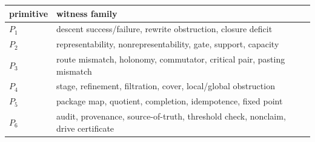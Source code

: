 \documentclass[11pt]{article}
\theoremstyle{definition}
\begin{document}
\begin{longtable}[]{@{}ll@{}}
\toprule
\begin{minipage}[b]{0.08\columnwidth}\raggedright
primitive\strut
\end{minipage} & \begin{minipage}[b]{0.86\columnwidth}\raggedright
witness family\strut
\end{minipage}\tabularnewline
\midrule
\endhead
\begin{minipage}[t]{0.08\columnwidth}\raggedright
\(P_{1}\)\strut
\end{minipage} & \begin{minipage}[t]{0.86\columnwidth}\raggedright
descent success/failure, rewrite obstruction, closure deficit\strut
\end{minipage}\tabularnewline
\begin{minipage}[t]{0.08\columnwidth}\raggedright
\(P_{2}\)\strut
\end{minipage} & \begin{minipage}[t]{0.86\columnwidth}\raggedright
representability, nonrepresentability, gate, support, capacity\strut
\end{minipage}\tabularnewline
\begin{minipage}[t]{0.08\columnwidth}\raggedright
\(P_{3}\)\strut
\end{minipage} & \begin{minipage}[t]{0.86\columnwidth}\raggedright
route mismatch, holonomy, commutator, critical pair, pasting mismatch\strut
\end{minipage}\tabularnewline
\begin{minipage}[t]{0.08\columnwidth}\raggedright
\(P_{4}\)\strut
\end{minipage} & \begin{minipage}[t]{0.86\columnwidth}\raggedright
stage, refinement, filtration, cover, local/global obstruction\strut
\end{minipage}\tabularnewline
\begin{minipage}[t]{0.08\columnwidth}\raggedright
\(P_{5}\)\strut
\end{minipage} & \begin{minipage}[t]{0.86\columnwidth}\raggedright
package map, quotient, completion, idempotence, fixed point\strut
\end{minipage}\tabularnewline
\begin{minipage}[t]{0.08\columnwidth}\raggedright
\(P_{6}\)\strut
\end{minipage} & \begin{minipage}[t]{0.86\columnwidth}\raggedright
audit, provenance, source-of-truth, threshold check, nonclaim, drive certificate\strut
\end{minipage}\tabularnewline
\bottomrule
\end{longtable}
\end{document}
